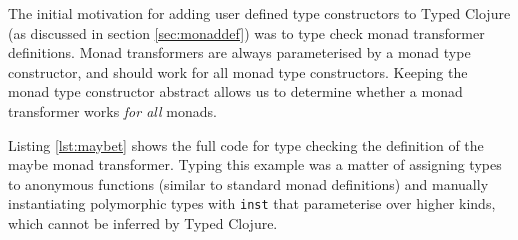 The initial motivation for adding user defined type constructors to Typed Clojure
(as discussed in section \ref{sec:monaddef}) was to type check
monad transformer definitions.
Monad transformers are always parameterised by a monad type constructor, and should work for all
monad type constructors. Keeping the monad type constructor abstract allows us to determine
whether a monad transformer works \emph{for all} monads.

Listing \ref{lst:maybet} shows the full code for type checking the definition
of the maybe monad transformer.
Typing this example was a matter of assigning types to anonymous functions
(similar to standard monad definitions) and manually instantiating 
polymorphic types with \lstinline|inst|
that parameterise over higher kinds, which cannot be inferred by Typed Clojure.

